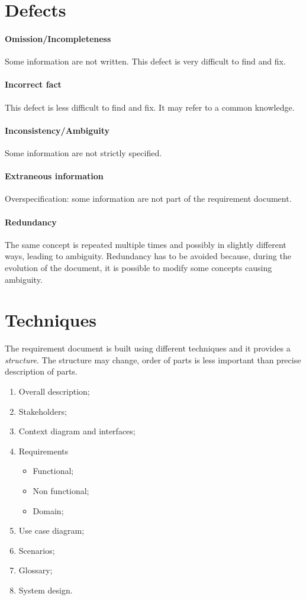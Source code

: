 \section{Defects}
\paragraph{Omission/Incompleteness}
Some information are not written. This defect is very difficult to find and fix.

\paragraph{Incorrect fact}
This defect is less difficult to find and fix. It may refer to a common knowledge.

\paragraph{Inconsistency/Ambiguity}
Some information are not strictly specified.

\paragraph{Extraneous information}
Overspecification: some information are not part of the requirement document.

\paragraph{Redundancy}
The same concept is repeated multiple times and possibly in slightly different ways, leading to ambiguity. Redundancy has to be avoided because, during the evolution of the document, it is possible to modify some concepts causing ambiguity.

\section{Techniques}
The requirement document is built using different techniques and it provides a \emph{structure}. The structure may change, order of parts is less important than precise description of parts.
\begin{enumerate}
\item Overall description;
\item Stakeholders;
\item Context diagram and interfaces;
\item Requirements
\begin{itemize}
\item Functional;
\item Non functional;
\item Domain;
\end{itemize}
\item Use case diagram;
\item Scenarios;
\item Glossary;
\item System design.
\end{enumerate}

